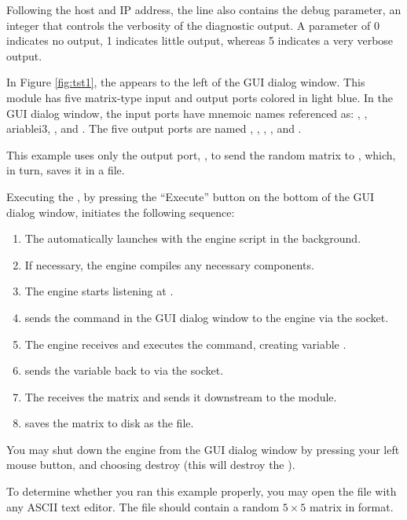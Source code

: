 Following the host and IP address, the  line also
contains the debug  parameter, an integer that controls the
verbosity of the diagnostic output.  A  parameter of 0
indicates no output, 1 indicates little output, whereas 5 indicates a very
verbose output.

In Figure \ref{fig:tst1}, the \mlm{} appears to the left of the GUI dialog
window.  This module has five matrix-type input and output ports colored in
light blue.  In the \mlm{} GUI dialog window, the input ports have mnemoic
names referenced as: , , ariable{i3},
, and .  The five output ports are named
, , , , and
.

This example uses only the output port, , to send the
random matrix to \sr{}, which, in turn, saves it in a file.

Executing the \mlm{}, by pressing the ``Execute'' button on the bottom of
the GUI dialog window, initiates the following sequence:
%
\begin{enumerate}
  \item The \mlm{} automatically launches \m{} with the engine script in
        the background. 
  \item If necessary, the engine compiles any necessary components.
  \item The engine starts listening at .
  \item \mlm{} sends the command in the GUI dialog window to the engine
        via the socket.
  \item The engine receives and executes the command, creating
        variable .
  \item \m{} sends the variable
         back to \sr{} via the socket.
  \item The  \mlm{} receives the matrix and sends it downstream to
        the  module. 
  \item {} saves the matrix to disk as the
         file. 
\end{enumerate}

You may shut down the \m{} engine from the \mlm{} GUI dialog window by
pressing your left mouse button, and choosing destroy (this will destroy
the \mlm{}).

To determine whether you ran this example properly, you may open the file
 with any ASCII text editor. The file should contain a
random $5 \times 5$ matrix in \sr{} format.

